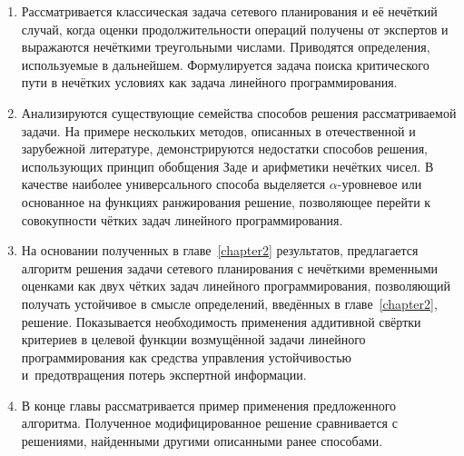 \begin{enumerate}
  \item Рассматривается классическая задача сетевого планирования и её нечёткий случай, когда оценки продолжительности операций получены от экспертов и выражаются нечёткими треугольными числами. Приводятся определения, используемые в дальнейшем. Формулируется задача поиска критического пути в нечётких условиях как задача линейного программирования.
  \item Анализируются существующие семейства способов решения рассматриваемой задачи. На примере нескольких методов, описанных в отечественной и зарубежной литературе, демонстрируются недостатки способов решения, использующих принцип обобщения Заде и арифметики нечётких чисел. В качестве наиболее универсального способа выделяется $\alpha$-уровневое или основанное на функциях ранжирования решение, позволяющее перейти к совокупности чётких задач линейного программирования.
  \item На основании полученных в главе~\ref{chapter2} результатов, предлагается алгоритм решения задачи сетевого планирования с нечёткими временными оценками как двух чётких задач линейного программирования, позволяющий получать устойчивое в смысле определений, введённых в главе~\ref{chapter2}, решение. Показывается необходимость применения аддитивной свёртки критериев в целевой функции возмущённой задачи линейного программирования как средства управления устойчивостью и~предотвращения потерь экспертной информации.
  \item В конце главы рассматривается пример применения предложенного алгоритма. Полученное модифицированное решение сравнивается с решениями, найденными другими описанными ранее способами.
\end{enumerate}